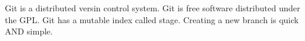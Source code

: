 ﻿Git is a distributed  versin control system.
Git is free software distributed under the GPL.
Git has a mutable index called stage.
Creating a new branch is quick AND simple.
